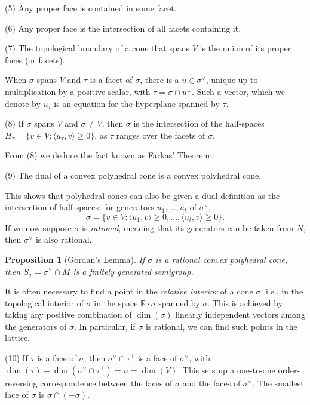 \documentclass[10pt,a4paper]{book}
\newtheorem{prop}[thm]{Proposition}
\newcommand{\on}{\operatorname}
\begin{document}
\smallskip
\noindent (5) Any proper face is contained in some facet.
\smallskip

\smallskip
\noindent (6) Any proper face is the intersection of all facets containing it.
\smallskip

\smallskip
\noindent (7) The topological boundary of a cone that spans $V$ is the union of its proper faces (or facets).
\medskip

When $\sigma$ spans $V$ and $\tau$ is a facet of $\sigma$, there is a $u\in \sigma^\vee$, unique up to multiplication by a positive scalar, with $\tau= \sigma\cap u^\perp$. Such a vector, which we denote by $u_\tau$ is an equation for the hyperplane spanned by $\tau$.

\medskip
\noindent (8) If $\sigma$ spans $V$ and $\sigma \neq V$, then $\sigma$ is the intersection of the half-spaces $H_\tau = \{v\in V: \langle u_\tau, v \rangle \geq 0\}$, as $\tau$ ranges over the facets of $\sigma$.
\medskip

From (8) we deduce the fact known as Farkas' Theorem:

\medskip 
\noindent (9) The dual of a convex polyhedral cone is a convex polyhedral cone.
\medskip


This shows that polyhedral cones can also be given a dual definition as the intersection of half-spaces: for generators $u_1,...,u_t$ of $\sigma^\vee$,
\[
\sigma = \{v\in V: \langle u_1, v\rangle \geq 0, ..., \langle u_t, v\rangle \geq 0 \}.
\]
If we now suppose $\sigma$ is \textit{rational}, meaning that its generators can be taken from $N$, then $\sigma^\vee$ is also rational.

\begin{prop}[Gordan's Lemma] If $\sigma$ is a rational convex polyhedral cone, then $S_\sigma = \sigma^\vee \cap M$ is a finitely generated semigroup.
\end{prop}

It is often necessary to find a point in the \textit{relative interior} of a cone $\sigma$, i.e., in the topological interior of $\sigma$ in the space $\mathbb{R}\cdot \sigma$ spanned by $\sigma$. This is achieved by taking any positive combination of $\on{dim}(\sigma)$ linearly independent vectors among the generators of $\sigma$. In particular, if $\sigma$ is rational, we can find such points in the lattice.

\medskip
\noindent (10) If $\tau$ is a face of $\sigma$, then $\sigma^\vee \cap \tau^\perp$ is a face of $\sigma^\vee$, with $\on{dim}(\tau)+\on{dim}(\sigma^\vee \cap \tau^\perp) = n = \on{dim}(V).$ This sets up a one-to-one order-reversing correspondence between the faces of $\sigma$ and the faces of $\sigma^\vee$. The smallest face of $\sigma$ is $\sigma\cap (-\sigma)$.
\medskip
\end{document}
